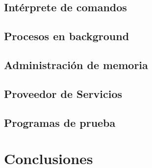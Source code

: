\documentclass[a4paper,10pt]{article}
\begin{document}
\subsection{Intérprete de comandos}

\subsection{Procesos en background}

\subsection{Administración de memoria}

\subsection{Proveedor de Servicios}

\subsection{Programas de prueba}


\newpage
\section{Conclusiones}

\bigskip
\end{document}
